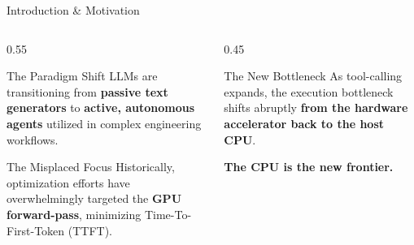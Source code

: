 \documentclass[aspectratio=169, 10pt]{beamer}
\begin{document}
\begin{frame}{Introduction \& Motivation}
  \begin{columns}
    \begin{column}{0.55\textwidth}
      \begin{block}{The Paradigm Shift}
        LLMs are transitioning from \textbf{passive text generators} to \textbf{active, autonomous agents} utilized in complex engineering workflows.
      \end{block}
      \vspace{0.4em}
      \begin{block}{The Misplaced Focus}
        Historically, optimization efforts have overwhelmingly targeted the \textcolor{neonamber}{\textbf{GPU forward-pass}}, minimizing Time-To-First-Token (TTFT).
      \end{block}
    \end{column}
    \begin{column}{0.45\textwidth}
      \begin{alertblock}{The New Bottleneck}
        As tool-calling expands, the execution bottleneck shifts abruptly \textbf{from the hardware accelerator back to the host CPU}.
      \end{alertblock}
      \vspace{0.5em}
      \begin{center}
        \textcolor{neonmint}{\textbf{The CPU is the new frontier.}}
      \end{center}
    \end{column}
  \end{columns}
\end{frame}
\end{document}
